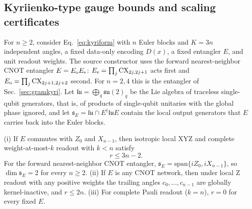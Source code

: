 \subsection{Kyriienko-type gauge bounds and scaling certificates}
\label{sec:kyrifamily}
For $n\ge2$, consider Eq.~\eqref{eq:kyriform} with $n$ Euler blocks
and $K=3n$ independent angles, a fixed data-only encoding
$D(x)$, a fixed entangler $E$, and unit readout weights. The source
constructor uses the forward nearest-neighbor CNOT entangler
$E=E_{\rm o}E_{\rm e}$: $E_{\rm e}=\prod_j\mathrm{CX}_{2j,2j+1}$
acts first and $E_{\rm o}=\prod_j\mathrm{CX}_{2j+1,2j+2}$ second.
For $n=2,4$ this is the entangler of Sec.~\ref{sec:gramkyri}. Let
$\mathfrak{lu}=\bigoplus_q\mathfrak{su}(2)_q$ be the Lie algebra of
traceless single-qubit generators, that is, of products of
single-qubit unitaries with the global phase ignored, and let
$\mathfrak s_E=\mathfrak{lu}\cap E^\dagger\mathfrak{lu}E$
contain the local output generators that $E$ carries back into the
Euler blocks.
\begin{proposition}\label{prop:kyribounds}
(i) If $E$ commutes with $Z_0$ and $X_{n-1}$, then isotropic local XYZ
and complete weight-at-most-$k$ readout with $k<n$ satisfy
\begin{equation}
 r\le3n-2.\label{eq:kyrifamilyupper}
\end{equation}
For the forward nearest-neighbor CNOT entangler,
$\mathfrak s_E=\mathrm{span}\{iZ_0,iX_{n-1}\}$, so
$\dim\mathfrak s_E=2$ for every $n\ge2$.
(ii) If $E$ is any CNOT network, then under local Z readout with any
positive weights the trailing angles $c_0,\ldots,c_{n-1}$ are globally
kernel-inactive, and $r\le2n$.
(iii) For complete Pauli readout ($k=n$), $r=0$ for every fixed $E$.
\end{proposition}
